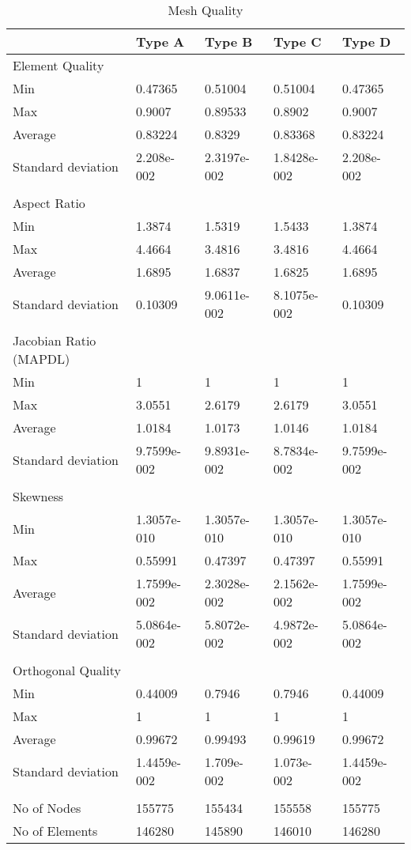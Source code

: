 \documentclass{article}
\begin{document}
\begin{table}[H]
\begin{center}
\caption{Mesh Quality} 
\begin{tabular}{lllll}
 & Type A & Type B & Type C & Type D \\
\hline
Element Quality  &  &  & &  \\
\hline
Min  & 0.47365 & 0.51004 & 0.51004 & 0.47365 \\
Max  & 0.9007 & 0.89533 & 0.8902 & 0.9007 \\
Average  & 0.83224 & 0.8329 & 0.83368 & 0.83224 \\
Standard deviation & 2.208e-002 & 2.3197e-002 & 1.8428e-002 & 2.208e-002 \\
\hline
\hline
 & & & & \\
Aspect Ratio & & & & \\
\hline
Min &				1.3874 & 1.5319	&		1.5433	&		1.3874 \\
Max 		&		4.4664&3.4816		&	3.4816	&		4.4664 \\
Average 		&	1.6895&1.6837	&		1.6825	&		1.6895 \\
Standard deviation 	& 0.10309&	9.0611e-002	&	8.1075e-002	&	0.10309 \\
\hline
\hline
 & & & & \\
Jacobian Ratio (MAPDL) & & & & \\
\hline
Min		&		1&1	&		1		&	1\\	
Max 		&		3.0551&2.6179		&	2.6179		&	3.0551\\
Average 	&	1.0184 &1.0173	&	1.0146		& 1.0184\\
Standard deviation 	&	9.7599e-002&9.8931e-002	&	8.7834e-002	&	9.7599e-002\\
\hline
\hline
 & & & & \\
Skewness & & & & \\
\hline
Min 		&		1.3057e-010&1.3057e-010	&	1.3057e-010	&	1.3057e-010\\
Max 		&		0.55991&0.47397&	0.47397	&	0.55991\\
Average 		&	1.7599e-002&2.3028e-002	&	2.1562e-002	&	1.7599e-002\\
Standard deviation	&	5.0864e-002&5.8072e-002	&	4.9872e-002	&	5.0864e-002\\
\hline
\hline
 & & & & \\
Orthogonal Quality & & & &\\
\hline
Min		&0.44009	&	0.7946		&	0.7946	&		0.44009\\
Max 		&	1&	1	&		1		&	1\\
Average 		& 0.99672 &	0.99493	&	0.99619	&	0.99672\\
Standard deviation 	& 1.4459e-002 &	1.709e-002	&	1.073e-002	&	1.4459e-002 \\
\hline
\hline
 & & & & \\
\hline
No of Nodes 	& 155775 &	155434 & 155558	 & 155775 \\
\hline
No of Elements 	 & 146280 &	145890 & 146010 & 146280 \\
\hline 
\end{tabular}
\end{center}
\end{table}
\end{document}
